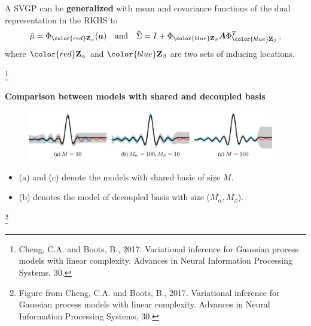 \documentclass[aspectratio=149]{beamer}
\begin{document}
    \begin{frame}
        A SVGP can be \textbf{\color{orange}generalized} with mean and covariance functions of the dual representation in the RKHS to
        \[
            \tilde{\mu} = \Phi_{\color{red}\mathbf{Z}_\alpha}(\bm{a}) \quad \text{and} \quad \tilde{\Sigma} = I + \Phi_{\color{blue}\mathbf{Z}_\beta }\bm{A}\Phi_{\color{blue}\mathbf{Z}_\beta}^T\,,
        \]
        where \(\color{red}\mathbf{Z}_\alpha\) and \(\color{blue}\mathbf{Z}_\beta\) are two sets of inducing locations.
        
    {\let\thefootnote\relax\footnote{{Cheng, C.A. and Boots, B., 2017. Variational inference for Gaussian process models with linear complexity. Advances in Neural Information Processing Systems, 30.}}}
    \end{frame}

     {\begin{frame}
        \begin{center}
            \textbf{Comparison between models with shared and decoupled basis}
        \end{center}
        \begin{figure}
            \centering
            \includegraphics[width = 0.96\textwidth]{slides_imgs/decoupled.jpg}
        \end{figure}
        
        \begin{itemize}
            \item (a) and (c) denote the models with shared basis of size \(M\).
            \item (b) denotes the model of decoupled basis with size (\(M_\alpha, M_\beta\)).
        \end{itemize} 

        {\let\thefootnote\relax\footnote{{Figure from Cheng, C.A. and Boots, B., 2017. Variational inference for Gaussian process models with linear complexity. Advances in Neural Information Processing Systems, 30.}}}
    \end{frame}}
\end{document}
